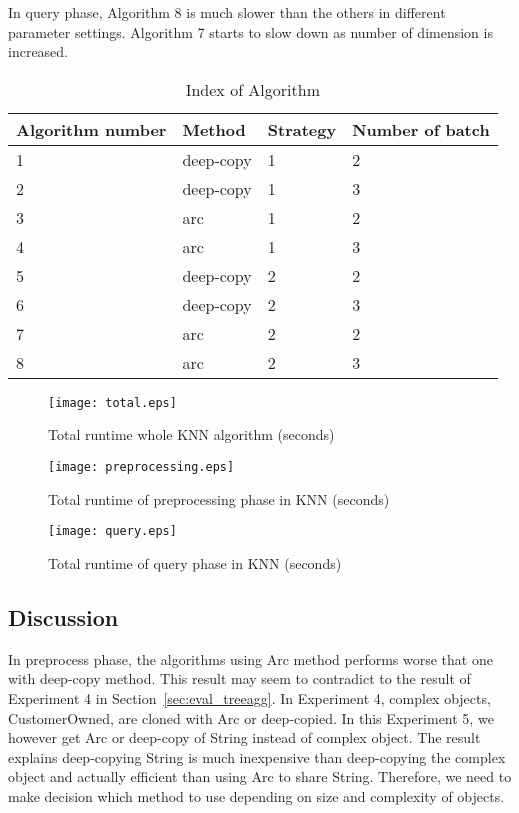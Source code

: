 In query phase, Algorithm 8 is much slower than the others in different parameter settings.
Algorithm 7 starts to slow down as number of dimension is increased. 


\begin{table}
    \renewcommand{\arraystretch}{1.2}
    \begin{tabular}{|l|l|l|l|}
    \hline
    Algorithm number & Method    & Strategy & Number of batch \\ \hline
    1                & deep-copy & 1        & 2               \\ \hline
    2                & deep-copy & 1        & 3               \\ \hline
    3                & arc       & 1        & 2               \\ \hline
    4                & arc       & 1        & 3               \\ \hline
    5                & deep-copy & 2        & 2               \\ \hline
    6                & deep-copy & 2        & 3               \\ \hline
    7                & arc       & 2        & 2               \\ \hline
    8                & arc       & 2        & 3               \\ \hline
    \end{tabular}
    \caption{Index of Algorithm}
    \label{tab:algorithm}
 \end{table}

\begin{figure}[htb]
    \texttt{[image: total.eps]}
    \caption{Total runtime whole KNN algorithm (seconds)}
    \label{fig:total}
\end{figure}

\begin{figure}[htb]
    \texttt{[image: preprocessing.eps]}
    \caption{Total runtime of preprocessing phase in KNN (seconds)}
    \label{fig:preprocess}
\end{figure}


\begin{figure}[htb]
    \texttt{[image: query.eps]}
    \caption{Total runtime of query phase in KNN (seconds)}
    \label{fig:query}
\end{figure}


\subsection{Discussion}
\label{sec:history}
In preprocess phase, the algorithms using Arc method performs worse that one with deep-copy method. 
This result may seem to contradict to the result of Experiment 4 in Section~\ref{sec:eval_treeagg}.
In Experiment 4, complex objects, CustomerOwned, are cloned with Arc or deep-copied. 
In this Experiment 5, we however get Arc or deep-copy of String instead of complex object.
The result explains deep-copying String is much inexpensive than deep-copying the complex object and 
actually efficient than using Arc to share String. 
Therefore, we need to make decision which method to use depending on size and complexity of objects.

